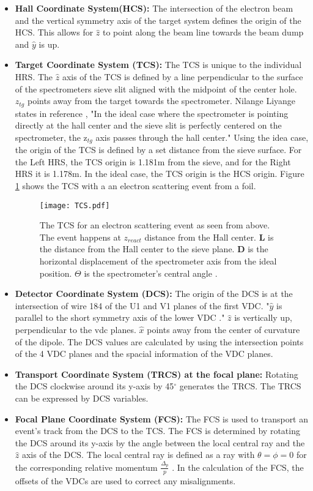 \begin{itemize}
	\item \textbf{Hall Coordinate System(HCS):} The intersection of the electron beam and the vertical symmetry axis of the target system defines the origin of the HCS. This allows for $\hat{z}$ to point along the beam line towards the beam dump and $\hat{y}$ is up. 
	\item \textbf{Target Coordinate System (TCS):} The TCS is unique to the individual HRS. The $\hat{z}$ axis of the TCS is defined by a line perpendicular to the surface of the spectrometers sieve slit aligned with the midpoint of the center hole. $z_{tg}$ points away from the target towards the spectrometer. Nilange Liyange states in reference \cite{optics}, "In the ideal case where the spectrometer is pointing directly at the hall center and the sieve slit is perfectly centered on the spectrometer, the z$_{tg}$ axis passes through the hall center." Using the idea case, the origin of the TCS is defined by a set distance from the sieve surface. For the Left HRS, the TCS origin is 1.181m from the sieve, and for the Right HRS it is 1.178m. In the ideal case, the TCS origin is the HCS origin. Figure \ref{fig:TCS} shows the TCS with a an electron scattering event from a foil.  
	\begin{figure}[]
		\centering
		\texttt{[image: TCS.pdf]}
		\caption{The TCS for an electron scattering event as seen from above. The event happens at $z_{react}$ distance from the Hall center. \textbf{L} is the distance from the Hall center to the sieve plane. \textbf{D} is the horizontal displacement of the spectrometer axis from the ideal position. $\Theta$ is the spectrometer's central angle \cite{optics}. }
		\label{fig:TCS}
	\end{figure}
	\item \textbf{Detector Coordinate System (DCS):}  The origin of the DCS is at the intersection of wire 184 of the U1 and V1 planes of the first VDC. "$\hat{y}$ is parallel to the short symmetry axis of the lower VDC \cite{espace}." $\hat{z}$ is vertically up, perpendicular to the vdc planes.  $\hat{x}$  points away from the center of curvature of the dipole. The DCS values are calculated by using the intersection points of the 4 VDC planes and the spacial information of the VDC planes.
	\item \textbf{Transport Coordinate System (TRCS) at the focal plane:} Rotating the DCS clockwise around its y-axis by 45$^\circ$ generates the TRCS. The TRCS can be expressed by  DCS variables. 	
	\item \textbf{Focal Plane Coordinate System (FCS):} The FCS is used to transport an event's track from the DCS to the TCS. The FCS is determined by rotating the DCS around its y-axis by the angle between the local central ray and the $\hat{z}$ axis of the DCS. The local central ray is defined as a ray with $\theta = \phi =0$ for the corresponding relative momentum $\frac{\Delta_p}{p}$ \cite{optics}. In the calculation of the FCS, the offsets of the VDCs are used to correct any misalignments.  
\end{itemize}
